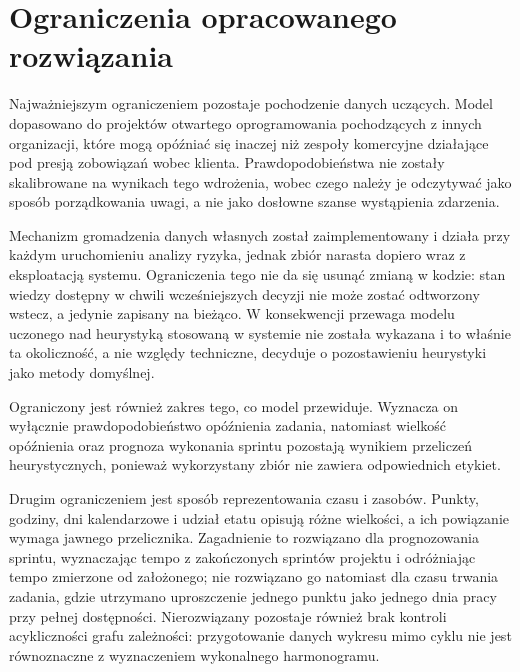 
\section{Ograniczenia opracowanego rozwiązania}

Najważniejszym ograniczeniem pozostaje pochodzenie danych uczących. Model dopasowano do projektów otwartego oprogramowania pochodzących z innych organizacji, które mogą opóźniać się inaczej niż zespoły komercyjne działające pod presją zobowiązań wobec klienta. Prawdopodobieństwa nie zostały skalibrowane na wynikach tego wdrożenia, wobec czego należy je odczytywać jako sposób porządkowania uwagi, a nie jako dosłowne szanse wystąpienia zdarzenia.

Mechanizm gromadzenia danych własnych został zaimplementowany i działa przy każdym uruchomieniu analizy ryzyka, jednak zbiór narasta dopiero wraz z eksploatacją systemu. Ograniczenia tego nie da się usunąć zmianą w kodzie: stan wiedzy dostępny w chwili wcześniejszych decyzji nie może zostać odtworzony wstecz, a jedynie zapisany na bieżąco. W konsekwencji przewaga modelu uczonego nad heurystyką stosowaną w systemie nie została wykazana i to właśnie ta okoliczność, a nie względy techniczne, decyduje o pozostawieniu heurystyki jako metody domyślnej.

Ograniczony jest również zakres tego, co model przewiduje. Wyznacza on wyłącznie prawdopodobieństwo opóźnienia zadania, natomiast wielkość opóźnienia oraz prognoza wykonania sprintu pozostają wynikiem przeliczeń heurystycznych, ponieważ wykorzystany zbiór nie zawiera odpowiednich etykiet.

Drugim ograniczeniem jest sposób reprezentowania czasu i zasobów. Punkty, godziny, dni kalendarzowe i udział etatu opisują różne wielkości, a ich powiązanie wymaga jawnego przelicznika. Zagadnienie to rozwiązano dla prognozowania sprintu, wyznaczając tempo z zakończonych sprintów projektu i odróżniając tempo zmierzone od założonego; nie rozwiązano go natomiast dla czasu trwania zadania, gdzie utrzymano uproszczenie jednego punktu jako jednego dnia pracy przy pełnej dostępności. Nierozwiązany pozostaje również brak kontroli acykliczności grafu zależności: przygotowanie danych wykresu mimo cyklu nie jest równoznaczne z wyznaczeniem wykonalnego harmonogramu.

